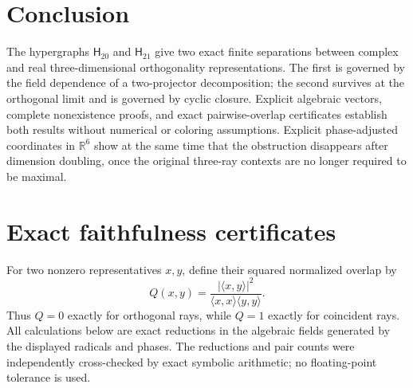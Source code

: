 \documentclass[twocolumn,aps,pra,floatfix,amsmath,amssymb,longbibliography]{revtex4-2}
\theoremstyle{definition}
\theoremstyle{remark}
\newcommand{\R}{\mathbb R}
\newcommand{\Htwenty}{\mathsf H_{20}}
\newcommand{\Htwentyone}{\mathsf H_{21}}
\begin{document}
\section{Conclusion}

The hypergraphs $\Htwenty$ and $\Htwentyone$ give two exact finite
separations between complex and real three-dimensional orthogonality
representations.  The first is governed by the field dependence of a
two-projector decomposition; the second survives at the orthogonal limit
and is governed by cyclic closure.  Explicit algebraic vectors,
complete nonexistence proofs, and exact pairwise-overlap certificates
establish both results without numerical or coloring assumptions.  Explicit
phase-adjusted coordinates in $\R^6$ show at the same time that the
obstruction disappears after dimension doubling, once the original
three-ray contexts are no longer required to be maximal.

\appendix

\section{Exact faithfulness certificates}
\label{app:faithfulness}

For two nonzero representatives $x,y$, define their squared normalized
overlap by
\begin{equation}
 Q(x,y)=\frac{|\langle x,y\rangle|^2}
 {\langle x,x\rangle\langle y,y\rangle}.
 \label{eq:Q}
\end{equation}
Thus $Q=0$ exactly for orthogonal rays, while $Q=1$ exactly for
coincident rays.  All calculations below are exact reductions in the
algebraic fields generated by the displayed radicals and phases.  The
reductions and pair counts were independently cross-checked by exact symbolic
arithmetic; no floating-point tolerance is used.
\end{document}
